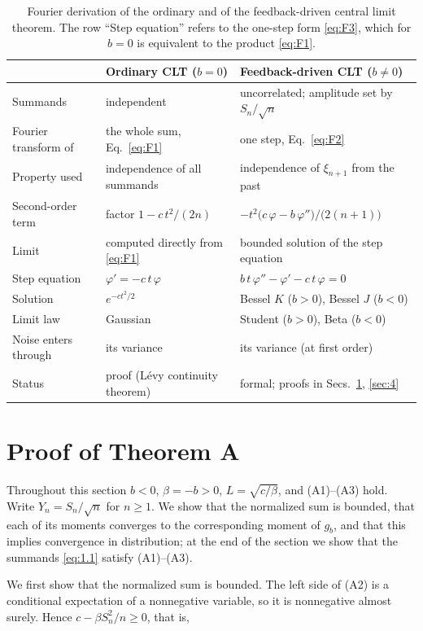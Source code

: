 \documentclass[aip,jmp,preprint,onecolumn,floatfix,superscriptaddress,nofootinbib,11pt]{revtex4-2}
\theoremstyle{plain}
\theoremstyle{remark}
\numberwithin{equation}{section}
\begin{document}
\begin{table}[H]
\caption{Fourier derivation of the ordinary and of the feedback-driven central limit theorem. The row ``Step equation'' refers to the one-step form \eqref{eq:F3}, which for $b=0$ is equivalent to the product \eqref{eq:F1}.}
\label{tab:fourier}
\centering\small
\begin{tabular}{lll}
\toprule
 & Ordinary CLT ($b=0$) & Feedback-driven CLT ($b\ne0$) \\
\midrule
Summands & independent & uncorrelated; amplitude set by $S_n/\sqrt n$ \\
Fourier transform of & the whole sum, Eq.~\eqref{eq:F1} & one step, Eq.~\eqref{eq:F2} \\
Property used & independence of all summands & independence of $\xi_{n+1}$ from the past \\
Second-order term & factor $1-c\,t^{2}/(2n)$ & $-t^{2}\big(c\,\varphi-b\,\varphi''\big)/\big(2(n+1)\big)$ \\
Limit & computed directly from \eqref{eq:F1} & bounded solution of the step equation \\
Step equation & $\varphi'=-c\,t\,\varphi$ & $b\,t\,\varphi''-\varphi'-c\,t\,\varphi=0$ \\
Solution & $e^{-ct^{2}/2}$ & Bessel $K$ ($b>0$), Bessel $J$ ($b<0$) \\
Limit law & Gaussian & Student ($b>0$), Beta ($b<0$) \\
Noise enters through & its variance & its variance (at first order) \\
Status & proof (L\'evy continuity theorem) & formal; proofs in Secs.~\ref{sec:3}, \ref{sec:4} \\
\bottomrule
\end{tabular}
\end{table}

\section{Proof of Theorem A}\label{sec:3}

Throughout this section $b<0$, $\beta=-b>0$, $L=\sqrt{c/\beta}$, and (A1)--(A3) hold. Write $Y_n=S_n/\sqrt n$ for $n\ge1$. We show that the normalized sum is bounded, that each of its moments converges to the corresponding moment of $g_b$, and that this implies convergence in distribution; at the end of the section we show that the summands \eqref{eq:1.1} satisfy (A1)--(A3).

We first show that the normalized sum is bounded. The left side of (A2) is a conditional expectation of a nonnegative variable, so it is nonnegative almost surely. Hence $c-\beta S_n^{2}/n\ge0$, that is,
\end{document}
